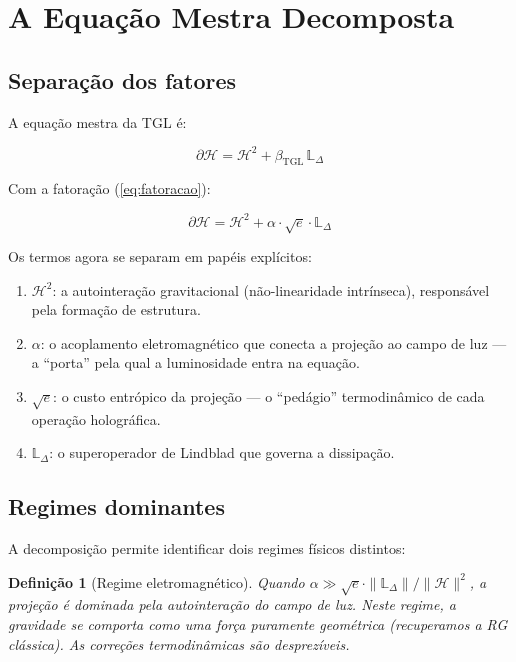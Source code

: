 \documentclass[12pt,a4paper,twoside]{article}
\newtheorem{definition}[theorem]{Definição}
\newcommand{\betatgl}{\beta_{\!\scriptscriptstyle\mathrm{TGL}}}
\begin{document}
\section{A Equação Mestra Decomposta}
\label{sec:mestra}

\subsection{Separação dos fatores}

A equação mestra da TGL \cite{Miguel2026Fronteira} é:

\begin{equation}
\partial\mathcal{H} = \mathcal{H}^2 + \betatgl\,\mathbb{L}_\Delta
\end{equation}

Com a fatoração (\ref{eq:fatoracao}):

\begin{equationbox}[title={Equação Mestra Fatorada}]
\begin{equation}
\boxed{\partial\mathcal{H} = \mathcal{H}^2 + \alpha \cdot \sqrt{e} \cdot \mathbb{L}_\Delta}
\label{eq:mestra_fatorada}
\end{equation}
\end{equationbox}

Os termos agora se separam em papéis explícitos:

\begin{enumerate}[nosep]
\item $\mathcal{H}^2$: a autointeração gravitacional (não-linearidade intrínseca), responsável pela formação de estrutura.
\item $\alpha$: o acoplamento eletromagnético que conecta a projeção ao campo de luz --- a ``porta'' pela qual a luminosidade entra na equação.
\item $\sqrt{e}$: o custo entrópico da projeção --- o ``pedágio'' termodinâmico de cada operação holográfica.
\item $\mathbb{L}_\Delta$: o superoperador de Lindblad que governa a dissipação.
\end{enumerate}

\subsection{Regimes dominantes}

A decomposição permite identificar dois regimes físicos distintos:

\begin{definition}[Regime eletromagnético]
Quando $\alpha \gg \sqrt{e} \cdot \|\mathbb{L}_\Delta\|/\|\mathcal{H}\|^2$, a projeção é dominada pela autointeração do campo de luz. Neste regime, a gravidade se comporta como uma força puramente geométrica (recuperamos a RG clássica). As correções termodinâmicas são desprezíveis.
\end{definition}
\end{document}
